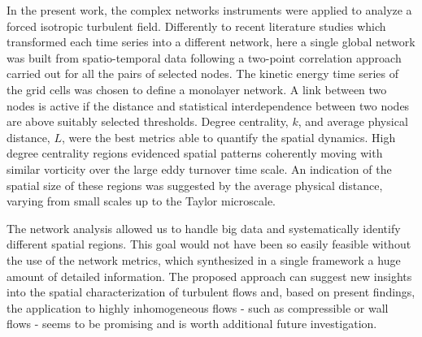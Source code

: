 \documentclass{ws-ijbc}
\begin{document}
In the present work, the complex networks instruments were applied to analyze a forced isotropic turbulent field. Differently to recent literature studies which transformed each time series into a different network, here a single global network was built from spatio-temporal data following a two-point correlation approach carried out for all the pairs of selected nodes. The kinetic energy time series of the grid cells was chosen to define a monolayer network. A link between two nodes is active if the distance and statistical interdependence between two nodes are above suitably selected thresholds. Degree centrality, $k$, and average physical distance, $L$, were the best metrics able to quantify the spatial dynamics. High degree centrality regions evidenced spatial patterns coherently moving with similar vorticity over the large eddy turnover time scale. An indication of the spatial size of these regions was suggested by the average physical distance, varying from small scales up to the Taylor microscale.

\noindent The network analysis allowed us to handle big data and systematically identify different spatial regions. This goal would not have been so easily feasible without the use of the network metrics, which synthesized in a single framework a huge amount of detailed information. The proposed approach can suggest new insights into the spatial characterization of turbulent flows and, based on present findings, the application to highly inhomogeneous flows - such as compressible or wall flows - seems to be promising and is worth additional future investigation.


\end{document}
